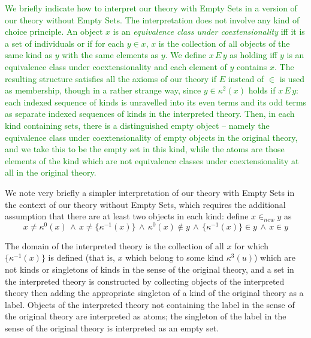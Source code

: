 \documentclass[12pt]{article}
\begin{document}
\textcolor{green}{We briefly indicate how to interpret our theory with Empty Sets in a
version of our theory without Empty Sets.  The interpretation does not
involve any kind of choice principle.  An object $x$ is an {\em
  equivalence class under coextensionality\/} iff it is a set of
individuals or if for each $y \in x$, $x$ is the collection of all
objects of the same kind as $y$ with the same elements as $y$.  We
define $x \, E \, y$ as holding iff $y$ is an equivalence class under
coextensionality and each element of $y$ contains $x$.  The resulting
structure satisfies all the axioms of our theory if $E$ instead of
$\in$ is used as membership, though in a rather strange way, since $y
\in \kappa^2(x)$ holds if $x \, E\, y$: each indexed sequence of kinds
is unravelled into its even terms and its odd terms as separate
indexed sequences of kinds in the interpreted theory.  Then, in each
kind containing sets, there is a distinguished empty object -- namely
the equivalence class under coextensionality of empty objects in the
original theory, and we take this to be the empty set in this kind,
while the atoms are those elements of the kind which are not
equivalence classes under coextensionality at all in the original
theory.}

{We note very briefly a simpler interpretation of our theory with Empty Sets in the context of our theory without Empty Sets, which requires the additional assumption that there are at least two objects in each kind:  define $x \in_{new} y$ as $$x \neq \kappa^0(x)\,  \wedge\,  x \neq\{\kappa^{-1}(x)\}\,  \wedge\,  \kappa^0(x) \not\in y\,  \wedge\,  \{\kappa^{-1}(x)\} \in y\, \wedge\,  x \in y$$}

{The domain of the interpreted theory is the collection of all $x$ for which $\{\kappa^{-1}(x)\}$ is defined (that is, $x$ which belong to some kind $\kappa^3(u)$) which are not kinds or singletons of kinds in the sense of the original theory, and a set in the interpreted theory is constructed by collecting objects of the interpreted theory then adding the appropriate singleton of a kind of the original theory as a label.  Objects of the interpreted theory not containing the label in the sense of the original theory are interpreted as atoms;  the singleton of the label in the sense of the original theory is interpreted as an empty set.}



\end{document}
